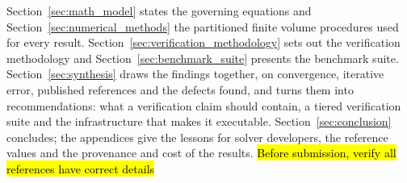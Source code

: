 Section~\ref{sec:math_model} states the governing equations and Section~\ref{sec:numerical_methods} the partitioned finite volume procedures used for every result.
Section~\ref{sec:verification_methodology} sets out the verification methodology and Section~\ref{sec:benchmark_suite} presents the benchmark suite.
Section~\ref{sec:synthesis} draws the findings together, on convergence, iterative error, published references and the defects found, and turns them into recommendations: what a verification claim should contain, a tiered verification suite and the infrastructure that makes it executable.
Section~\ref{sec:conclusion} concludes; the appendices give the lessons for solver developers, the reference values and the provenance and cost of the results.
\hl{Before submission, verify all references have correct details}
